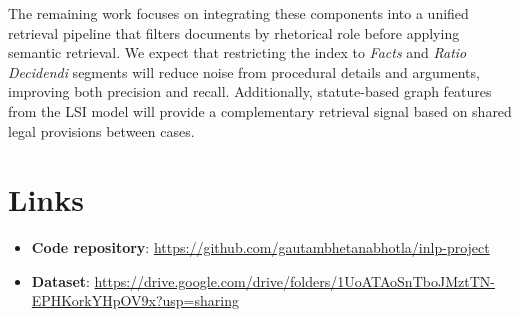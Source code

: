 \documentclass[11pt]{article}
\begin{document}
The remaining work focuses on integrating these components into a unified retrieval pipeline that filters documents by rhetorical role before applying semantic retrieval.
We expect that restricting the index to \emph{Facts} and \emph{Ratio Decidendi} segments will reduce noise from procedural details and arguments, improving both precision and recall.
Additionally, statute-based graph features from the LSI model will provide a complementary retrieval signal based on shared legal provisions between cases.

\section{Links}
\begin{itemize}
    \item \textbf{Code repository}: \url{https://github.com/gautambhetanabhotla/inlp-project}
    \item \textbf{Dataset}: \url{https://drive.google.com/drive/folders/1UoATAoSnTboJMztTN-EPHKorkYHpOV9x?usp=sharing}
\end{itemize}

\nocite{*}

\end{document}
